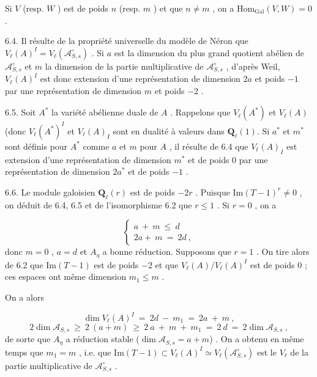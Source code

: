
Si $V$ (resp. $W$ ) est de poids $n$ (resp. $m$ ) et que $n \neq m$ , on a $\mathrm{Hom}_{\mathrm{Gal}}(V,W) = 0$ .

6.4. Il résulte de la propriété universelle du modèle de Néron que $V_{\ell}(A)^{I} = V_{\ell}(\mathcal{A}^{\circ}_{S,s})$ . Si $a$ est la dimension du plus grand quotient abélien de $\mathcal{A}^{\circ}_{S,s}$ et $m$ la dimension de la partie multiplicative de $\mathcal{A}^{\circ}_{S,s}$ , d'après Weil, $V_{\ell}(A)^{I}$ est donc extension d'une représentation de dimension $2a$ et poids $-1$ par une représentation de dimension $m$ et poids $-2$ .

6.5. Soit $A^{*}$ la variété abélienne duale de $A$ . Rappelons que $V_{\ell}(A^{*})$ et $V_{\ell}(A)$ (donc $V_{\ell}(A^{*})^{I}$ et $V_{\ell}(A)_{I}$ sont en dualité à valeurs dans $\mathbf{Q}_{\ell}(1)$. Si $a^{*}$ et $m^{*}$ sont définis pour $A^{*}$ comme $a$ et $m$ pour $A$ , il résulte de 6.4 que $V_{\ell}(A)_{I}$ est extension d'une représentation de dimension $m^{*}$ et de poids 0 par une représentation de dimension $2a^{*}$ et de poids $-1$ .

6.6. Le module galoisien $\mathbf{Q}_{\ell}(r)$ est de poids $-2r$ . Puisque $\mathrm{Im}(T-1)^{r} \neq 0$ , on déduit de 6.4, 6.5 et de l'isomorphisme 6.2 que $r \leqslant 1$ . Si $r = 0$ , on a

\begin{equation*}
\left\{
\begin{array}{l}
a \ + \ m \ \leqslant \ d \\[2ex]
2a + \ m \ = \ 2d \ ,
\end{array}
\right.
\end{equation*}
donc $m = 0$ , $a = d$ et $A_{\eta}$ a bonne réduction. Supposons que $r = 1$ . On tire alors de 6.2 que $\mathrm{Im}(T-1)$ est de poids $-2$ et que $V_{\ell}(A)/V_{\ell}(A)^{I}$ est de poids 0 ; ces espaces ont même dimension $m_{1} \leqslant m$ .

On a alors

\begin{equation*}
\dim V_{\ell}(A)^{I} \ = \ 2d \ - \ m_{1} \ = \ 2a \ + \ m \ ,
\end{equation*}
\begin{equation*}
2 \dim \mathcal{A}_{S,s} \ \geqslant \ 2 \ (a + m) \ \geqslant \ 2 \ a \ + \ m \ + \ m_{1} \ = \ 2 \ d \ = \ 2 \dim \mathcal{A}_{S,s} \ ,
\end{equation*}
de sorte que $A_{\eta}$ a réduction stable ($\dim \mathcal{A}_{S,s} = a + m$) . On a obtenu en même temps que $m_{1} = m$ , i.e. que $\mathrm{Im}(T-1) \subset V_{\ell}(A)^{I} \simeq V_{\ell}(\mathcal{A}^{\circ}_{S,s})$ est le $V_{\ell}$ de la partie multiplicative de $\mathcal{A}^{\circ}_{S,s}$ .

